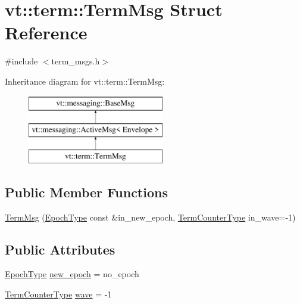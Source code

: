 \hypertarget{structvt_1_1term_1_1_term_msg}{}\section{vt\+:\+:term\+:\+:Term\+Msg Struct Reference}
\label{structvt_1_1term_1_1_term_msg}


{\ttfamily \#include $<$term\+\_\+msgs.\+h$>$}

Inheritance diagram for vt\+:\+:term\+:\+:Term\+Msg\+:\begin{figure}[H]
\begin{center}
\leavevmode
\includegraphics[height=3.000000cm]{structvt_1_1term_1_1_term_msg}
\end{center}
\end{figure}
\subsection*{Public Member Functions}
\begin{DoxyCompactItemize}
\item 
\hyperlink{structvt_1_1term_1_1_term_msg_a099cbed49c4d73d9627c20463334db39}{Term\+Msg} (\hyperlink{namespacevt_a81d11b28122d43bf9834577e4a06440f}{Epoch\+Type} const \&in\+\_\+new\+\_\+epoch, \hyperlink{namespacevt_1_1term_a4fd378cdb0c36683afc1b3399d685f7f}{Term\+Counter\+Type} in\+\_\+wave=-\/1)
\end{DoxyCompactItemize}
\subsection*{Public Attributes}
\begin{DoxyCompactItemize}
\item 
\hyperlink{namespacevt_a81d11b28122d43bf9834577e4a06440f}{Epoch\+Type} \hyperlink{structvt_1_1term_1_1_term_msg_a1890be8aa1a0d1a148331d3c0ea229e3}{new\+\_\+epoch} = no\+\_\+epoch
\item 
\hyperlink{namespacevt_1_1term_a4fd378cdb0c36683afc1b3399d685f7f}{Term\+Counter\+Type} \hyperlink{structvt_1_1term_1_1_term_msg_a4090f02c6dae636a0c2b31c101532255}{wave} = -\/1
\end{DoxyCompactItemize}
